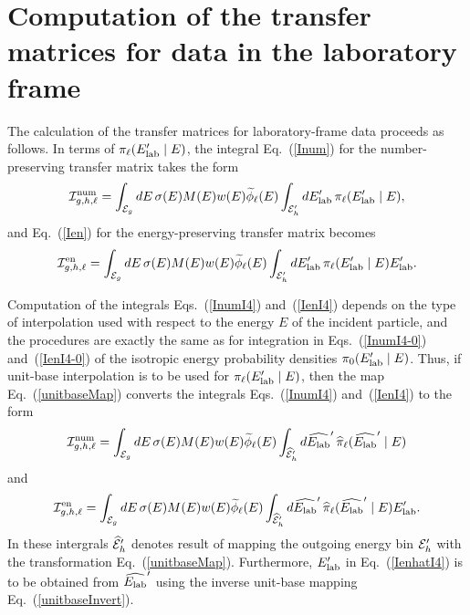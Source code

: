 \section{Computation of the transfer matrices for data in the laboratory frame}
The calculation of the transfer
matrices for laboratory-frame data proceeds as follows.
In terms of $\pi_\ell(E_{\text{lab}}'   \mid E)$,
the integral Eq.~(\ref{Inum}) for the number-preserving transfer matrix
takes the form
\begin{equation}
   {\cal I}^{\text{num}}_{g,h,\ell} =
     \int_{{\cal E}_g} dE \, \sigma ( E ) M(E) w(E) \widetilde \phi_\ell(E)
   \int_{{\cal E}_h' } dE_{\text{lab}}'   \, \pi_\ell(E_{\text{lab}}'   \mid E),
 \label{InumI4}
\end{equation}
and Eq.~(\ref{Ien}) for the energy-preserving transfer matrix becomes
\begin{equation}
   {\cal I}^{\text{en}}_{g,h,\ell} =
     \int_{{\cal E}_g} dE \, \sigma ( E ) M(E) w(E) \widetilde \phi_\ell(E) 
     \int_{{\cal E}_h' } dE_{\text{lab}}'   \, \pi_\ell(E_{\text{lab}}'   \mid E) E_{\text{lab}}'  .
 \label{IenI4}
\end{equation}

Computation of the integrals Eqs.~(\ref{InumI4}) and~(\ref{IenI4})
depends on the type of interpolation used with respect to the
energy $E$ of the incident particle, and the procedures are
exactly the same as for integration in Eqs.~(\ref{InumI4-0}) 
and~(\ref{IenI4-0}) of the isotropic energy probability densities
$\pi_0(E_{\text{lab}}'   \mid E)$.  Thus, if unit-base interpolation is to
be used for $\pi_\ell(E_{\text{lab}}'   \mid E)$, then the map Eq.~(\ref{unitbaseMap})
converts 
the integrals Eqs.~(\ref{InumI4}) and~(\ref{IenI4}) to the form
\begin{equation}
   {\cal I}^{\text{num}}_{g,h,\ell} =
     \int_{{\cal E}_g} dE \, \sigma ( E ) M(E) w(E) \widetilde \phi_\ell(E) 
   \int_{\widehat{{\cal E}}_h' } d\widehat {E_{\text{lab}}}'   \,
     \widehat\pi_\ell(\widehat {E_{\text{lab}}}'   \mid E)
 \label{InumhatI4}
\end{equation}
and
\begin{equation}
   {\cal I}^{\text{en}}_{g,h,\ell} =
     \int_{{\cal E}_g} dE \, \sigma ( E ) M(E) w(E) \widetilde \phi_\ell(E) 
   \int_{\widehat{{\cal E}}_h' } d\widehat {E_{\text{lab}}}'   \,
     \widehat\pi_\ell(\widehat {E_{\text{lab}}}'   \mid E) E_{\text{lab}}'  .
 \label{IenhatI4}
\end{equation}
In these intergrals $\widehat{{\cal E}}_h'$ denotes result of mapping the 
outgoing energy bin ${\cal E}_h'$ with the transformation Eq.~(\ref{unitbaseMap}).
Furthermore, $E_{\text{lab}}'  $ in Eq.~(\ref{IenhatI4}) is to be obtained from $\widehat {E_{\text{lab}}}'  $
using the inverse unit-base mapping Eq.~(\ref{unitbaseInvert}).

